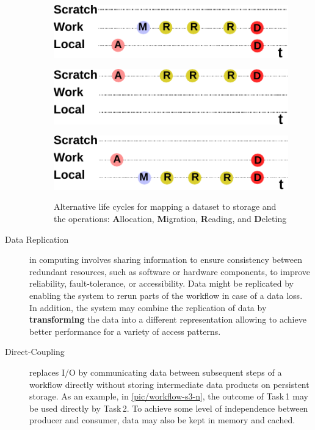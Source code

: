 \documentclass{superfri}
\begin{document}
\begin{description}
\begin{figure}[b]
    \begin{minipage}{.33\linewidth}
        \centering
        \includegraphics[width=0.9\columnwidth]{pic/lifecycle-1}
        \label{fig:lifecycle1}
    \end{minipage}
    \begin{minipage}{.33\linewidth}
        \centering
        \includegraphics[width=0.9\columnwidth]{pic/lifecycle-2}
        \label{fig:lifecycle2}
    \end{minipage}
    \begin{minipage}{.33\linewidth}
        \centering
        \includegraphics[width=0.9\columnwidth]{pic/lifecycle-3}
        \label{fig:lifecycle3}
    \end{minipage}
    \vspace{5pt}
    \caption{Alternative life cycles for mapping a dataset to storage and the operations: \textbf{A}llocation, \textbf{M}igration, \textbf{R}eading, and \textbf{D}eleting}
    \label{fig:lifecycle}
\end{figure}

\item[Data Replication] in computing involves sharing information to ensure consistency between redundant resources, such as software or hardware components, to improve reliability, fault-tolerance, or accessibility.
Data might be replicated by enabling the system to rerun parts of the workflow in case of a data loss.
In addition, the system may combine the replication of data by \textbf{transforming} the data into a different representation allowing to achieve better performance for a variety of access patterns.

\item[Direct-Coupling] replaces I/O by communicating data between subsequent steps of a workflow directly without storing intermediate data products on persistent storage.
As an example, in \cref{pic/workflow-s3-n}, the outcome of Task\,1 may be used directly by Task\,2.
To achieve some level of independence between producer and consumer, data may also be kept in memory and cached.
\end{description}
\end{document}
